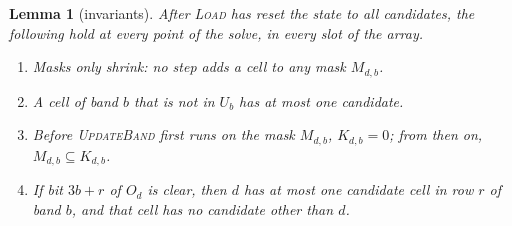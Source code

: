 \documentclass[11pt]{article}
\newtheorem{lemma}[theorem]{Lemma}
\theoremstyle{definition}
\theoremstyle{plain}
\let\origtextsc\textsc
\renewcommand{\textsc}[1]{\textup{\origtextsc{#1}}}
\begin{document}
\begin{lemma}[invariants]
\label{lem:invariants}
After \textsc{Load} has reset the state to all candidates, the following hold at every point of the solve, in every slot of the array.
\begin{enumerate}
\item[(I0)] \emph{Masks only shrink:} no step adds a cell to any mask $M_{d,b}$.
\item[(I1)] A cell of band $b$ that is not in $U_b$ has at most one candidate.
\item[(I2)] Before \textsc{UpdateBand} first runs on the mask $M_{d,b}$, $K_{d,b}=0$; from then on,
  $M_{d,b}\subseteq K_{d,b}$.
\item[(I3)] If bit $3b+r$ of $O_d$ is clear, then $d$ has at most one candidate cell in row $r$ of band $b$, and that
  cell has no candidate other than $d$.
\end{enumerate}
\end{lemma}
\end{document}
